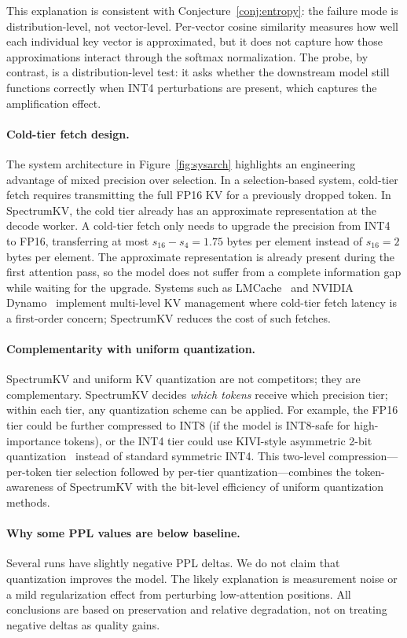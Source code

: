 \documentclass[11pt]{article}
\newcommand{\method}{SpectrumKV}
\theoremstyle{plain}
\theoremstyle{definition}
\begin{document}
This explanation is consistent with Conjecture~\ref{conj:entropy}: the failure mode is distribution-level, not vector-level.  Per-vector cosine similarity measures how well each individual key vector is approximated, but it does not capture how those approximations interact through the softmax normalization.  The probe, by contrast, is a distribution-level test: it asks whether the downstream model still functions correctly when INT4 perturbations are present, which captures the amplification effect.

\paragraph{Cold-tier fetch design.}
The system architecture in Figure~\ref{fig:sysarch} highlights an engineering advantage of mixed precision over selection.  In a selection-based system, cold-tier fetch requires transmitting the full FP16 KV for a previously dropped token.  In \method{}, the cold tier already has an approximate representation at the decode worker.  A cold-tier fetch only needs to upgrade the precision from INT4 to FP16, transferring at most $s_{16} - s_4 = 1.75$ bytes per element instead of $s_{16} = 2$ bytes per element.  The approximate representation is already present during the first attention pass, so the model does not suffer from a complete information gap while waiting for the upgrade.  Systems such as LMCache~\citep{lmcache} and NVIDIA Dynamo~\citep{nvidiadynamo} implement multi-level KV management where cold-tier fetch latency is a first-order concern; \method{} reduces the cost of such fetches.

\paragraph{Complementarity with uniform quantization.}
\method{} and uniform KV quantization are not competitors; they are complementary.  \method{} decides \emph{which tokens} receive which precision tier; within each tier, any quantization scheme can be applied.  For example, the FP16 tier could be further compressed to INT8 (if the model is INT8-safe for high-importance tokens), or the INT4 tier could use KIVI-style asymmetric 2-bit quantization~\citep{kivi} instead of standard symmetric INT4.  This two-level compression---per-token tier selection followed by per-tier quantization---combines the token-awareness of \method{} with the bit-level efficiency of uniform quantization methods.

\paragraph{Why some PPL values are below baseline.}
Several runs have slightly negative PPL deltas.  We do not claim that quantization improves the model.  The likely explanation is measurement noise or a mild regularization effect from perturbing low-attention positions.  All conclusions are based on preservation and relative degradation, not on treating negative deltas as quality gains.
\end{document}
